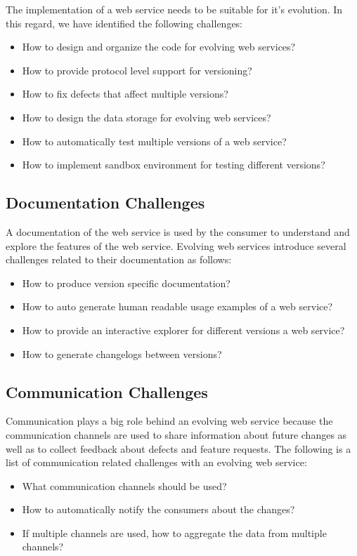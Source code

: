 \documentclass[runningheads,a4paper]{llncs}
\begin{document}
The implementation of a web service needs to be suitable for it’s evolution. In this regard, we have identified the following challenges:
\begin{itemize}
  \item How to design and organize the code for evolving web services?
  \item How to provide protocol level support for versioning?
  \item How to fix defects that affect multiple versions?
  \item How to design the data storage for evolving web services?
  \item How to automatically test multiple versions of a web service?
  \item How to implement sandbox environment for testing different versions?
\end{itemize}


\subsection{Documentation Challenges} %
\label{ssub:documentation_challenges}
A documentation of the web service is used by the consumer to understand and explore the features of the web service. Evolving web services introduce several challenges related to their documentation as follows:
\begin{itemize}
  \item How to produce version specific documentation?
  \item How to auto generate human readable usage examples of a web service?
  \item How to provide an interactive explorer for different versions a web service?
  \item How to generate changelogs between versions?
\end{itemize}

\subsection{Communication Challenges} %
\label{sub:communication_challenges}
Communication plays a big role behind an evolving web service because the communication channels are used to share information about future changes as well as to collect feedback about defects and feature requests. The following is a list of communication related challenges with an evolving web service:
\begin{itemize}
  \item What communication channels should be used?
  \item How to automatically notify the consumers about the changes?
  \item If multiple channels are used, how to aggregate the data from multiple channels?
\end{itemize}
\end{document}
